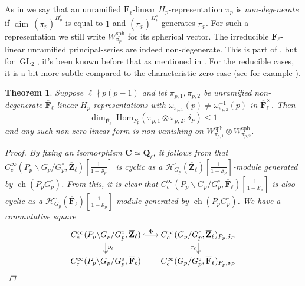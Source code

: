 \documentclass{amsart}%
\theoremstyle{plain}
\newtheorem{thm}{Theorem}[subsection]
\theoremstyle{plain}
\theoremstyle{remark}
\DeclareMathOperator{\GL}{GL}
\DeclareMathOperator{\ch}{ch}
\begin{document}
As in \cite[\S $3.3$]{groutides2024integral} we say that an unramified $\overline{\mathbf{F}}_\ell$-linear 
 $H_p$-representation $\pi_p$ is \textit{non-degenerate} if $\dim\ (\pi_p)^{H_p^\circ}$ is equal to $1$ and $(\pi_p)^{H_p^\circ}$ generates $\pi_p$. For such a representation we still write $W_{\pi_p}^\mathrm{sph}$ for its spherical vector. The irreducible $\overline{\mathbf{F}}_\ell$-linear unramified principal-series are indeed non-degenerate. This is part of \cite{minguez2014unramified}, but for $\GL_2$, it's been known before that as mentioned in \cite{barthel1995modular}. For the reducible cases, it is a bit more subtle compared to the characteristic zero case (see for example \cite{vigneras1989representations}). 
 \begin{thm}\label{thm modular mult 1 mirabolic}
     Suppose $\ell\nmid p(p-1)$ and let $\pi_{p,1},\pi_{p,2}$ be unramified non-degenerate $\overline{\mathbf{F}}_\ell$-linear $H_p$-representations with $\omega_{\pi_{p,1}}(p)\neq \omega_{\pi_{p,2}}^{-1}(p)$ in $\overline{\mathbf{F}}_\ell^\times$. Then
     $$\dim_{\overline{\mathbf{F}}_\ell}\ \mathrm{Hom}_{P_p}(\pi_{p,1}\otimes\pi_{p,2},\delta_P)\leq 1$$
     and any such non-zero linear form is non-vanishing on $W_{\pi_{p,1}}^\mathrm{sph}\otimes W_{\pi_{p,2}}^\mathrm{sph}$.
     \begin{proof}
         By fixing an isomorphism $\mathbf{C}\simeq\overline{\mathbf{Q}}_\ell$, it follows from  that $C_c^\infty(P_p\backslash G_p/G_p^\circ,\overline{\mathbf{Z}}_\ell)[\frac{1}{1-\mathcal{S}_p}]$ is cyclic as a $\mathcal{H}_{G_p}^\circ(\overline{\mathbf{Z}}_\ell)[\frac{1}{1-\mathcal{S}_p}]$-module generated by $\ch(P_pG_p^\circ)$. From this, it is clear that $C_c^\infty(P_p\backslash G_p/G_p^\circ,\overline{\mathbf{F}}_\ell)[\frac{1}{1-\mathcal{S}_p}]$ is also cyclic as a $\mathcal{H}_{G_p}^\circ(\overline{\mathbf{F}}_\ell)[\frac{1}{1-\mathcal{S}_p}]$-module generated by $\ch(P_pG_p^\circ)$. We have a commutative square
         \[\begin{tikzcd}[ampersand replacement=\&,cramped,sep=scriptsize]
	{C_c^\infty(P_p\backslash G_p/G_p^\circ,\overline{\mathbf{Z}}_\ell)} \& {C_c^\infty(G_p/G_p^\circ,\overline{\mathbf{Z}}_\ell)_{P_p,\delta_P}} \\
	{C_c^\infty(P_p\backslash G_p/G_p^\circ,\overline{\mathbf{F}}_\ell)} \& {C_c^\infty(G_p/G_p^\circ,\overline{\mathbf{F}}_\ell)_{P_p,\delta_P}}
	\arrow["{\nu_\ell}", two heads, from=1-1, to=2-1]
	\arrow["{\tau_\ell}"', two heads, from=1-2, to=2-2]
	\arrow["\Phi", hook, from=1-1, to=1-2]

\end{tikzcd}\]
\end{proof}
\end{thm}
\end{document}
